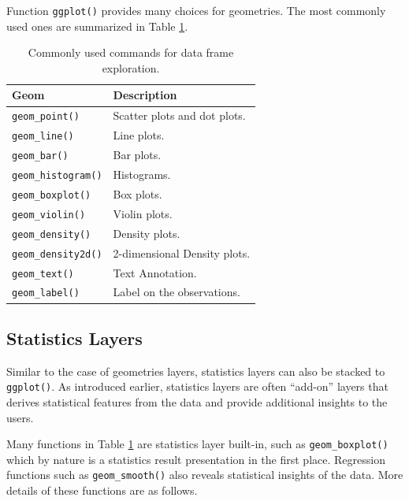 Function \verb|ggplot()| provides many choices for geometries. The most commonly used ones are summarized in Table \ref{ch:r1:tab:geoms}.
\begin{table}
  \centering \caption{Commonly used commands for data frame exploration.}\label{ch:r1:tab:geoms}
  \begin{tabularx}{\textwidth}{lX}
    \hline
    \textbf{Geom} & \textbf{Description} \\ \hline
    \verb|geom_point()|   & Scatter plots and dot plots. \\
    \verb|geom_line()|    & Line plots.   \\
    \verb|geom_bar()|     & Bar plots. \\
    \verb|geom_histogram()| & Histograms. \\
    \verb|geom_boxplot()| & Box plots. \\
    \verb|geom_violin()| & Violin plots.\\
    \verb|geom_density()| & Density plots.\\
    \verb|geom_density2d()| & 2-dimensional Density plots.\\
    \verb|geom_text()| & Text Annotation.\\
    \verb|geom_label()| & Label on the observations.\\ \hline
    \end{tabularx}
\end{table}

\subsection{Statistics Layers}

Similar to the case of geometries layers, statistics layers can also be stacked to \verb|ggplot()|. As introduced earlier, statistics layers are often ``add-on'' layers that derives statistical features from the data and provide additional insights to the users.

Many functions in Table \ref{ch:r1:tab:geoms} are statistics layer built-in, such as \verb|geom_boxplot()| which by nature is a statistics result presentation in the first place. Regression functions such as \verb|geom_smooth()| also reveals statistical insights of the data. More details of these functions are as follows.

